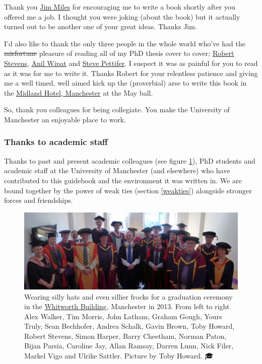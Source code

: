 \documentclass[
]{book}
\begin{document}
Thank you \href{https://en.wikipedia.org/wiki/James_John_Miles}{Jim Miles} for encouraging me to write a book shortly after you offered me a job. I thought you were joking (about the book) but it actually turned out to be another one of your great ideas. Thanks Jim. 🙏

I'd also like to thank the only three people in the whole world who've had the \sout{misfortune} pleasure of reading all of my PhD thesis cover to cover; \href{https://en.wikipedia.org/wiki/Robert_David_Stevens}{Robert Stevens}, \href{https://www.ncl.ac.uk/computing/staff/profile/anilwipat.html}{Anil Wipat} and \href{https://en.wikipedia.org/wiki/Steve_Pettifer}{Steve Pettifer}. I suspect it was as painful for you to read as it was for me to write it. Thanks Robert for your relentless patience and giving me a well timed, well aimed kick up the (proverbial) arse to write this book in the \href{https://en.wikipedia.org/wiki/Midland_Hotel,_Manchester}{Midland Hotel, Manchester} at the May ball.

So, thank you colleagues for being collegiate. You make the University of Manchester an enjoyable place to work.

\hypertarget{academia}{%
\subsubsection{Thanks to academic staff}\label{academia}}

Thanks to past and present academic colleagues (see figure \ref{fig:academics-fig}), PhD students and academic staff at the University of Manchester (and elsewhere) who have contributed to this guidebook and the environment it was written in. We are bound together by the power of weak ties (section \ref{weakties}) alongside stronger forces and friendships.

\begin{figure}

{\centering \includegraphics[width=1\linewidth]{images/graduation-ceremony-2013} 

}

\caption{Wearing silly hats and even sillier frocks for a graduation ceremony in the \href{https://en.wikipedia.org/wiki/Whitworth_Building}{Whitworth Building}, Manchester in 2013. From left to right Alex Walker, Tim Morris, John Latham, Graham Gough, Yours Truly, Sean Bechhofer, Andrea Schalk, Gavin Brown, Toby Howard, Robert Stevens, Simon Harper, Barry Cheetham, Norman Paton, Bijan Parsia, Caroline Jay, Allan Ramsay, Darren Lunn, Nick Filer, Markel Vigo and Ulrike Sattler. Picture by Toby Howard. 🎓}\label{fig:academics-fig}
\end{figure}
\end{document}
